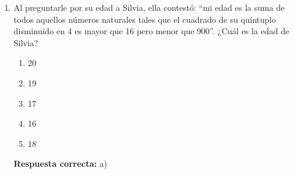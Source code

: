 \begin{enumerate}[resume]
	Halle $m$ en\\
	
	$\boxed{\begin{matrix} 10\\ 1 \end{matrix}}X^2= \boxed{\begin{matrix} m\\ \sqrt{10} \end{matrix}}X$
	
	\begin{enumerate}[label=\alph*)]
		\item 14
		\item 18
		\item 20
		\item 22
		\item 26
	\end{enumerate}
	\textbf{Respuesta correcta:} e)
	
	\vspace{2mm}
	\textbf{Solucionario:}
	
	En la izquierda, $n-1=2\Rightarrow n=3$:
	
	$\boxed{\begin{matrix} 10\\ 1 \end{matrix}}X^2=\dfrac13(10^3-1^3)=\dfrac{999}{3}=333$
	
	En la derecha, $n-1=1\Rightarrow n=2$:
	
	$\boxed{\begin{matrix} m\\ \sqrt{10} \end{matrix}}X=\dfrac12(m^2-10)$
	
	Igualando:
	
	$\dfrac12(m^2-10)=333$
	
	$m^2-10=666$
	
	$m^2=676 \Rightarrow m=$
	
	\vspace{6mm}
	
	\item Al preguntarle por su edad a Silvia, ella contestó: “mi edad es la suma de todos aquellos números naturales tales que el cuadrado de su quíntuplo disminuido en 4 es mayor que 16 pero menor que 900”. ¿Cuál es la edad de Silvia?
	\begin{enumerate}[label=\alph*)]
		\item 20
		\item 19
		\item 17
		\item 16
		\item 18
	\end{enumerate}
	\textbf{Respuesta correcta:} a)
	

\end{enumerate}
